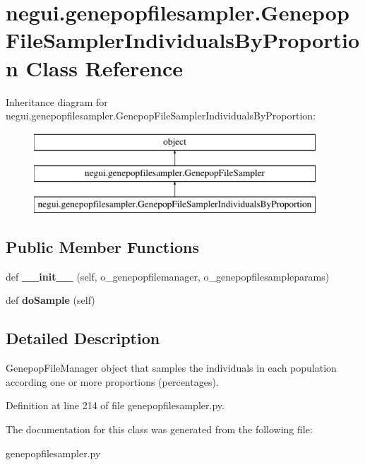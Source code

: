 \hypertarget{classnegui_1_1genepopfilesampler_1_1GenepopFileSamplerIndividualsByProportion}{}\section{negui.\+genepopfilesampler.\+Genepop\+File\+Sampler\+Individuals\+By\+Proportion Class Reference}
\label{classnegui_1_1genepopfilesampler_1_1GenepopFileSamplerIndividualsByProportion}
Inheritance diagram for negui.\+genepopfilesampler.\+Genepop\+File\+Sampler\+Individuals\+By\+Proportion\+:\begin{figure}[H]
\begin{center}
\leavevmode
\includegraphics[height=3.000000cm]{classnegui_1_1genepopfilesampler_1_1GenepopFileSamplerIndividualsByProportion}
\end{center}
\end{figure}
\subsection*{Public Member Functions}
\begin{DoxyCompactItemize}
\item 
def {\bfseries \+\_\+\+\_\+init\+\_\+\+\_\+} (self, o\+\_\+genepopfilemanager, o\+\_\+genepopfilesampleparams)\hypertarget{classnegui_1_1genepopfilesampler_1_1GenepopFileSamplerIndividualsByProportion_a1bc0babcecf6bbca34259328cae53b97}{}\label{classnegui_1_1genepopfilesampler_1_1GenepopFileSamplerIndividualsByProportion_a1bc0babcecf6bbca34259328cae53b97}

\item 
def {\bfseries do\+Sample} (self)\hypertarget{classnegui_1_1genepopfilesampler_1_1GenepopFileSamplerIndividualsByProportion_ad8170ea6661afa7bff72d484372209e3}{}\label{classnegui_1_1genepopfilesampler_1_1GenepopFileSamplerIndividualsByProportion_ad8170ea6661afa7bff72d484372209e3}

\end{DoxyCompactItemize}


\subsection{Detailed Description}
\begin{DoxyVerb}GenepopFileManager object that samples the individuals in each population
according one or more proportions (percentages).
\end{DoxyVerb}
 

Definition at line 214 of file genepopfilesampler.\+py.



The documentation for this class was generated from the following file\+:\begin{DoxyCompactItemize}
\item 
genepopfilesampler.\+py\end{DoxyCompactItemize}
